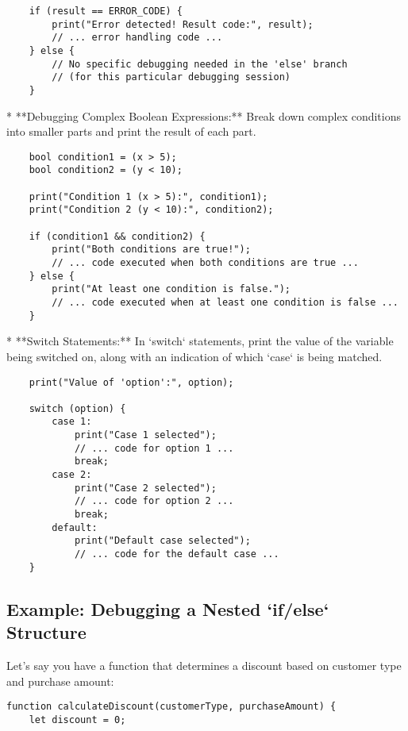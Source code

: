 \documentclass{article}
\begin{document}
{{{    \begin{verbatim}
    if (result == ERROR_CODE) {
        print("Error detected! Result code:", result);
        // ... error handling code ...
    } else {
        // No specific debugging needed in the 'else' branch
        // (for this particular debugging session)
    }
    \end{verbatim}

*   **Debugging Complex Boolean Expressions:** Break down complex conditions into smaller parts and print the result of each part.

    \begin{verbatim}
    bool condition1 = (x > 5);
    bool condition2 = (y < 10);

    print("Condition 1 (x > 5):", condition1);
    print("Condition 2 (y < 10):", condition2);

    if (condition1 && condition2) {
        print("Both conditions are true!");
        // ... code executed when both conditions are true ...
    } else {
        print("At least one condition is false.");
        // ... code executed when at least one condition is false ...
    }
    \end{verbatim}

*   **Switch Statements:** In `switch` statements, print the value of the variable being switched on, along with an indication of which `case` is being matched.

    \begin{verbatim}
    print("Value of 'option':", option);

    switch (option) {
        case 1:
            print("Case 1 selected");
            // ... code for option 1 ...
            break;
        case 2:
            print("Case 2 selected");
            // ... code for option 2 ...
            break;
        default:
            print("Default case selected");
            // ... code for the default case ...
    }
    \end{verbatim}

\subsection*{Example: Debugging a Nested `if/else` Structure}

Let's say you have a function that determines a discount based on customer type and purchase amount:

\begin{verbatim}
function calculateDiscount(customerType, purchaseAmount) {
    let discount = 0;


\end{verbatim}}}}
\end{document}
